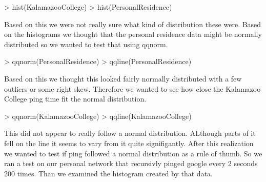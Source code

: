 \documentclass{article}
\begin{document}
\begin{Schunk}
\begin{Sinput}
> hist(KalamazooCollege)
> hist(PersonalResidence)
\end{Sinput}
\end{Schunk}

Based on this we were not really sure what kind of distribution these were.  Based on the histograms we thought that the personal residence data might be normally distributed so we wanted to test that using qqnorm.

\begin{Schunk}
\begin{Sinput}
> qqnorm(PersonalResidence)
> qqline(PersonalResidence)
\end{Sinput}
\end{Schunk}

Based on this we thought this looked fairly normally distributed with a few outliers or some right skew.  Therefore we wanted to see how close the Kalamazoo College ping time fit the normal distribution.

\begin{Schunk}
\begin{Sinput}
> qqnorm(KalamazooCollege)
> qqline(KalamazooCollege)
\end{Sinput}
\end{Schunk}
This did not appear to really follow a normal distribution.  ALthough parts of it fell on the line it seems to vary from it quite signifigantly.  After this realization we wanted to test if ping followed a normal distribution as a rule of thumb.  So we ran a test on our personal network that recursivly pinged google every 2 seconds 200 times.  Than we examined the histogram created by that data.

\begin{Schunk}
\end{Schunk}
\end{document}
